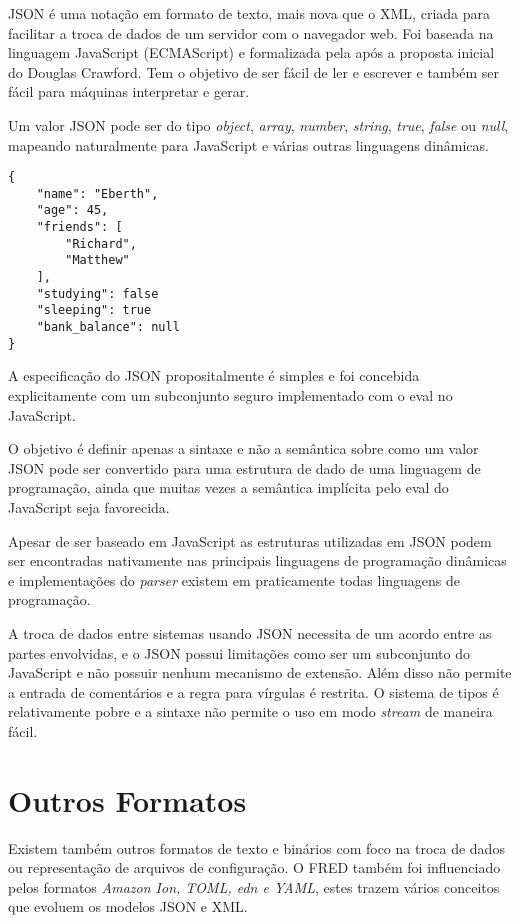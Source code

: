 JSON é uma notação em formato de texto, mais nova que o XML, criada para facilitar a troca de 
dados de um servidor com o navegador web. Foi baseada na linguagem JavaScript (ECMAScript) e formalizada 
pela  após a proposta inicial do Douglas Crawford.
Tem o objetivo de ser fácil de ler e escrever e também ser fácil para máquinas interpretar e gerar.

Um valor JSON pode ser do tipo \textit{object}, \textit{array}, \textit{number}, \textit{string}, 
\textit{true}, \textit{false} ou \textit{null}, mapeando naturalmente para JavaScript e várias outras linguagens
dinâmicas.

\begin{lstlisting}[caption=Exemplo de JSON,label={lst:jsonobj}]
{
    "name": "Eberth",
    "age": 45,
    "friends": [
        "Richard",
        "Matthew"
    ],
    "studying": false
    "sleeping": true
    "bank_balance": null
}
\end{lstlisting}

A especificação do JSON propositalmente é simples e foi concebida explicitamente
com um subconjunto seguro implementado com o eval no JavaScript. 

O objetivo é definir apenas a sintaxe e não a semântica sobre como um valor JSON pode 
ser convertido para uma estrutura de dado de uma linguagem de programação, ainda que
muitas vezes a semântica implícita pelo eval do JavaScript seja favorecida.

Apesar de ser baseado em JavaScript as estruturas utilizadas em JSON podem ser encontradas 
nativamente nas principais linguagens de programação dinâmicas e implementações do \textit{parser}
existem em praticamente todas linguagens de programação.

A troca de dados entre sistemas usando JSON necessita de um acordo entre as partes envolvidas, e o JSON
possui limitações como ser um subconjunto do JavaScript e não possuir nenhum mecanismo de extensão.
Além disso não permite a entrada de comentários e a regra para vírgulas é restrita. O sistema de tipos 
é relativamente pobre e a sintaxe não permite o uso em modo \textit{stream} de maneira fácil.

\section{Outros Formatos}

Existem também outros formatos de texto e binários com foco na troca de dados
ou representação de arquivos de configuração. O FRED também foi influenciado 
pelos formatos \textit{Amazon Ion, TOML, edn e YAML}, estes trazem vários conceitos 
que evoluem os modelos JSON e XML.

